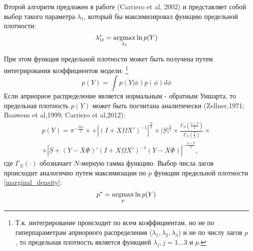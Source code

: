 \documentclass[11pt]{article} %
\newcommand{\argmax}{\operatornamewithlimits{argmax}}
\begin{document}
Второй алгоритм предложен в работе (Carriero et al, 2002) и представляет собой выбор такого параметра $\lambda_1$, который бы максимизировал функцию предельной плотности:
\begin{equation}
\lambda_{1t}^*=\argmax_{\lambda_1} \ln p(Y)
\end{equation}

При этом функция предельной плотности может быть получена путем интегрирования коэффициентов модели: \footnote{Т.к. интегрирование происходит по  всем коэффициентам, но не по гиперпараметрам априорного распределения ($\lambda_1,\lambda_2,\lambda_3$)  и не по числу лагов $p$, то предельная плотность является функцией $\lambda_j,j=1\ldots 3$ и $p$.}
\begin{equation}
p(Y)=\int p(Y|\phi)p(\phi) d \phi
\end{equation}
Если априорное распределение является нормальным - обратным Уишарта, то предельная плотность $p(Y)$ может быть посчитана аналитически (Zellner,1971; Bauwens et al,1999; Carriero et al,2012):
\begin{multline}
p(Y)=\pi^{-\frac{Tm}{2}}\times +\left |(I+X\underline{\Omega} X')^{-1}\right|^{\frac{N}{2}}\times |\underline{S}|^{\frac{\underline{\nu}}{2}}\times \frac{\Gamma_N(\frac{\underline{\nu}+T}{2})}{\Gamma_N(\frac{\underline{\nu}}{2})}\times \\ \times
\left|\underline{S}+(Y-X\underline{\Phi})'(I+X\underline{\Omega} X')^{-1}(Y-X\underline{\Phi})\right|^{-\frac{\underline{\nu}+T}{2}},\label{marginal_density}
\end{multline}
где $\Gamma_N(\cdot)$ обозначает $N$-мерную гамма функцию.
Выбор числа лагов происходит аналогично путем максимизации по $p$ функции предельной плотности \eqref{marginal_density}: 
\begin{equation}
p^*=\argmax_{p} \ln p(Y)
\end{equation} 
\end{document}
